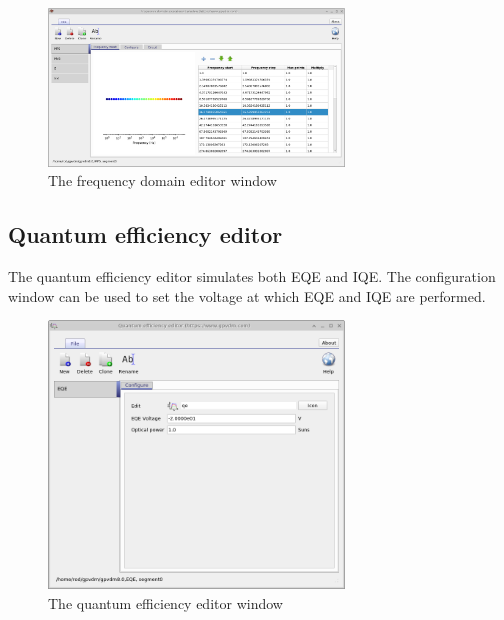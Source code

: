 \begin{figure}[H]
\centering
\includegraphics[width=0.7\textwidth,height=0.5\textwidth]{./images/fx_domain_editor.png}
\caption{The frequency domain editor window}
\label{fig:fxdomaineditor}
\end{figure}

\subsection{Quantum efficiency editor}
The quantum efficiency editor simulates both EQE and IQE.  The configuration window can be used to set the voltage at which EQE and IQE are performed.
\begin{figure}[H]
\centering
\includegraphics[width=0.7\textwidth,height=0.5\textwidth]{./images/qe_editor.png}
\caption{The quantum efficiency editor window}
\label{fig:qeeditor}
\end{figure}


